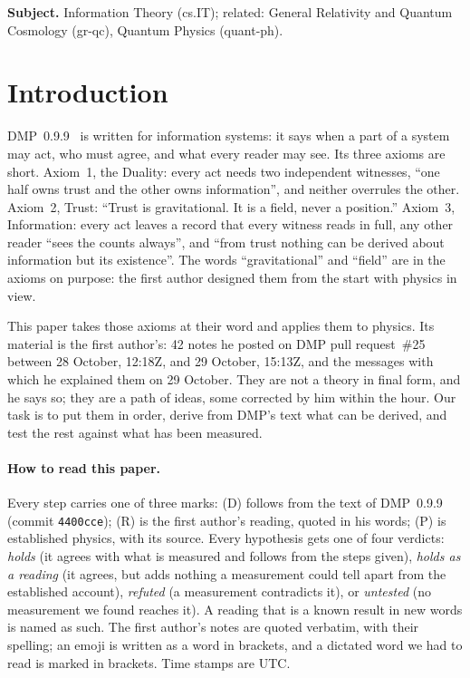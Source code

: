 \documentclass[11pt,a4paper]{article}
\theoremstyle{definition}
\theoremstyle{remark}
\newcommand{\tagD}{\textsf{(D)}}
\newcommand{\tagR}{\textsf{(R)}}
\newcommand{\tagP}{\textsf{(P)}}
\begin{document}
\noindent\textbf{Subject.} Information Theory (cs.IT); related: General Relativity and Quantum Cosmology (gr-qc), Quantum Physics (quant-ph).

\section{Introduction}\label{sec:intro}

DMP~0.9.9~\cite{dmp} is written for information systems: it says when a part of a system may act, who must agree, and what every
reader may see. Its three axioms are short. Axiom~1, the Duality: every act needs two independent witnesses, ``one half owns trust and the
other owns information'', and neither overrules the other. Axiom~2, Trust: ``Trust is gravitational. It is a field, never a position.''
Axiom~3, Information: every act leaves a record that every witness reads in full, any other reader ``sees the counts always'', and ``from
trust nothing can be derived about information but its existence''. The words ``gravitational'' and ``field'' are in the axioms on purpose:
the first author designed them from the start with physics in view.

This paper takes those axioms at their word and applies them to physics. Its material is the first author's: 42 notes he posted on DMP pull
request~\#25 between 28 October, 12:18Z, and 29 October, 15:13Z, and the messages with which he explained them on 29 October. They are not
a theory in final form, and he says so; they are a path of ideas, some corrected by him within the hour. Our task is to put them in order,
derive from DMP's text what can be derived, and test the rest against what has been measured.

\paragraph{How to read this paper.} Every step carries one of three marks: \tagD{} follows from the text of DMP~0.9.9 (commit
\texttt{4400cce}); \tagR{} is the first author's reading, quoted in his words; \tagP{} is established physics, with its source. Every
hypothesis gets one of four verdicts: \emph{holds} (it agrees with what is measured and follows from the steps given), \emph{holds as a
reading} (it agrees, but adds nothing a measurement could tell apart from the established account), \emph{refuted} (a measurement
contradicts it), or \emph{untested} (no measurement we found reaches it). A reading that is a known result in new words is named as
such. The first author's notes are quoted verbatim, with their spelling; an emoji is written as a word in brackets, and a dictated word we
had to read is marked in brackets. Time stamps are UTC.
\end{document}
